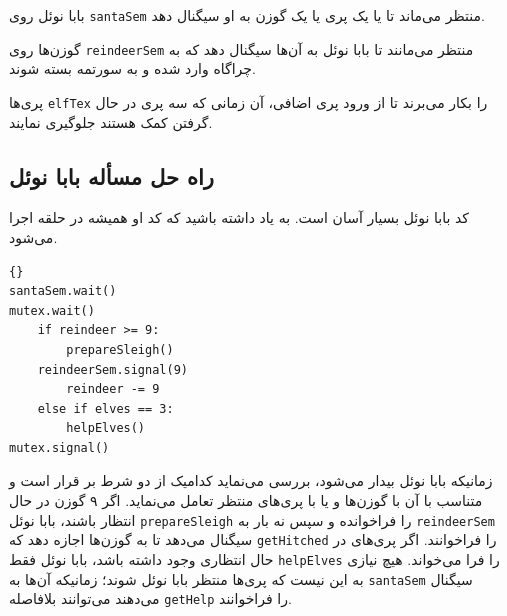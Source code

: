 \documentclass{book}
\newcommand{\clearemptydoublepage}{\newpage\cleardoublepage}
\begin{document}
    بابا نوئل روی  {\tt santaSem} منتظر می‌ماند تا یا یک پری یا یک گوزن به او سیگنال دهد. 

    گوزن‌ها روی {\tt reindeerSem} منتظر می‌مانند تا بابا نوئل به آن‌ها سیگنال دهد که به چراگاه وارد شده و به سورتمه بسته شوند. 

    پری‌ها {\tt elfTex} را بکار می‌برند تا از ورود پری اضافی، آن زمانی که سه پری در حال گرفتن کمک هستند جلوگیری نمایند. 


\clearemptydoublepage
\subsection{راه حل مسأله بابا نوئل}

    کد بابا نوئل بسیار آسان است. به یاد داشته باشید که کد او همیشه در حلقه اجرا می‌شود. 

\begin{latin}
\begin{lstlisting}[title=\rl{راه حل مسأله بابا نوئل (بابا نوئل)}]{}
santaSem.wait()
mutex.wait()
    if reindeer >= 9:
        prepareSleigh()
	reindeerSem.signal(9)
        reindeer -= 9
    else if elves == 3:
        helpElves()
mutex.signal()
\end{lstlisting}
\end{latin}

    زمانیکه بابا نوئل بیدار می‌شود، بررسی می‌نماید کدامیک از دو شرط بر قرار است و متناسب با آن با گوزن‌ها  و یا با پری‌های منتظر تعامل می‌نماید. 
    اگر ۹ گوزن در حال انتظار باشند، بابا نوئل  {\tt prepareSleigh} را فراخوانده و سپس نه بار به {\tt reindeerSem} سیگنال می‌دهد تا به گوزن‌ها
    اجازه دهد که {\tt getHitched} را فراخوانند. اگر پری‌های در حال انتظاری وجود داشته باشد، بابا نوئل فقط {\tt helpElves} را فرا می‌خواند. 
    هیچ نیازی به این نیست که پری‌ها منتظر بابا نوئل شوند؛ زمانیکه آن‌ها به {\tt santaSem} سیگنال می‌دهند می‌توانند بلافاصله  {\tt getHelp}  را فراخوانند. 
\end{document}
